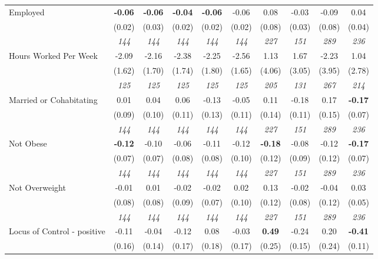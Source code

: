 \begin{tabular}{l c c c c c c c c c}
Employed & \textbf{ -0.06 } & \textbf{ -0.06 } & \textbf{ -0.04 } & \textbf{-0.06} & -0.06 & 0.08 & -0.03 & -0.09 & 0.04 \\
& (0.02) & (0.03) & (0.02) & (0.02) & (0.02) & (0.08) & (0.03) & (0.08) & (0.04) \\
& \textit{ 144 } & \textit{ 144 } & \textit{ 144 } & \textit{ 144 } & \textit{ 144 } & \textit{ 227 } & \textit{ 151 } & \textit{ 289 } & \textit{ 236 } \\
Hours Worked Per Week & -2.09 & -2.16 & -2.38 & -2.25 & -2.56 & 1.13 & 1.67 & -2.23 & 1.04 \\
& (1.62) & (1.70) & (1.74) & (1.80) & (1.65) & (4.06) & (3.05) & (3.95) & (2.78) \\
& \textit{ 125 } & \textit{ 125 } & \textit{ 125 } & \textit{ 125 } & \textit{ 125 } & \textit{ 205 } & \textit{ 131 } & \textit{ 267 } & \textit{ 214 } \\
Married or Cohabitating & 0.01 & 0.04 & 0.06 & -0.13 & -0.05 & 0.11 & -0.18 & 0.17 & \textbf{-0.17} \\
& (0.09) & (0.10) & (0.11) & (0.13) & (0.11) & (0.14) & (0.11) & (0.15) & (0.07) \\
& \textit{ 144 } & \textit{ 144 } & \textit{ 144 } & \textit{ 144 } & \textit{ 144 } & \textit{ 227 } & \textit{ 151 } & \textit{ 289 } & \textit{ 236 } \\
Not Obese & \textbf{ -0.12 } & -0.10 & -0.06 & -0.11 & -0.12 & \textbf{ -0.18 } & -0.08 & -0.12 & \textbf{-0.17} \\
& (0.07) & (0.07) & (0.08) & (0.08) & (0.10) & (0.12) & (0.09) & (0.12) & (0.07) \\
& \textit{ 144 } & \textit{ 144 } & \textit{ 144 } & \textit{ 144 } & \textit{ 144 } & \textit{ 227 } & \textit{ 151 } & \textit{ 289 } & \textit{ 236 } \\
Not Overweight & -0.01 & 0.01 & -0.02 & -0.02 & 0.02 & 0.13 & -0.02 & -0.04 & 0.03 \\
& (0.08) & (0.08) & (0.09) & (0.07) & (0.10) & (0.12) & (0.08) & (0.12) & (0.05) \\
& \textit{ 144 } & \textit{ 144 } & \textit{ 144 } & \textit{ 144 } & \textit{ 144 } & \textit{ 227 } & \textit{ 151 } & \textit{ 289 } & \textit{ 236 } \\
Locus of Control - positive & -0.11 & -0.04 & -0.12 & 0.08 & -0.03 & \textbf{ 0.49 } & -0.24 & 0.20 & \textbf{-0.41} \\
& (0.16) & (0.14) & (0.17) & (0.18) & (0.17) & (0.25) & (0.15) & (0.24) & (0.11) \\

\end{tabular}
